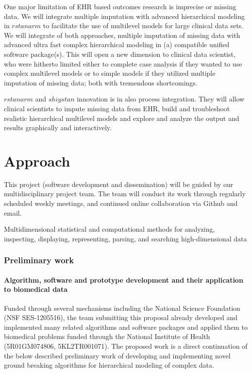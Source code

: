 \documentclass[11pt,notitlepage]{article}
\begin{document}
One major limitation of EHR based outcomes research is imprecise or missing data. We will integrate multiple imputation with advanced hierarchical modeling in $rstanarm$ to facilitate the use of multilevel models for large clinical data sets. We will integrate of both approaches, multiple imputation of missing data with advanced ultra fast complex hierarchical modeling in (a) compatible unified software package(s). This will open a new dimension to clinical data scientist, who were hitherto limited either to complete case analysis if they wanted to use complex multilevel models or to simple models if they utilized multiple imputation of missing data; both with tremendous shortcomings. 

$rstanarm$ and $shiystan$ innovation is in also process integration. They will allow clinical scientists to impute missing data from EHR, build and troubleshoot realistic hierarchical multilevel models and explore and analyze the output and results graphically and interactively. 

\part*{Approach}
This project (software development and dissemination) will be guided by our multidisciplinary project team. The team will conduct its work through regularly scheduled weekly meetings, and continued online collaboration via Github and email. 

Multidimensional statistical and computational methods for analyzing, inspecting, displaying, representing, parsing, and searching high-dimensional data

\section*{Preliminary work}

\subsection*{Algorithm, software and prototype development and their application to biomedical data}
Funded through several mechanisms including the National Science Foundation (NSF SES-1205516), the team submitting this proposal already developed and implemented many related algorithms and software packages and applied them to biomedical problems funded through the National Institute of Health (5R01GM074806, 5KL2TR001071). The proposed work is a direct continuation of the below described preliminary work of developing and implementing novel ground breaking algorithms for hierarchical modeling of complex data.
\end{document}
